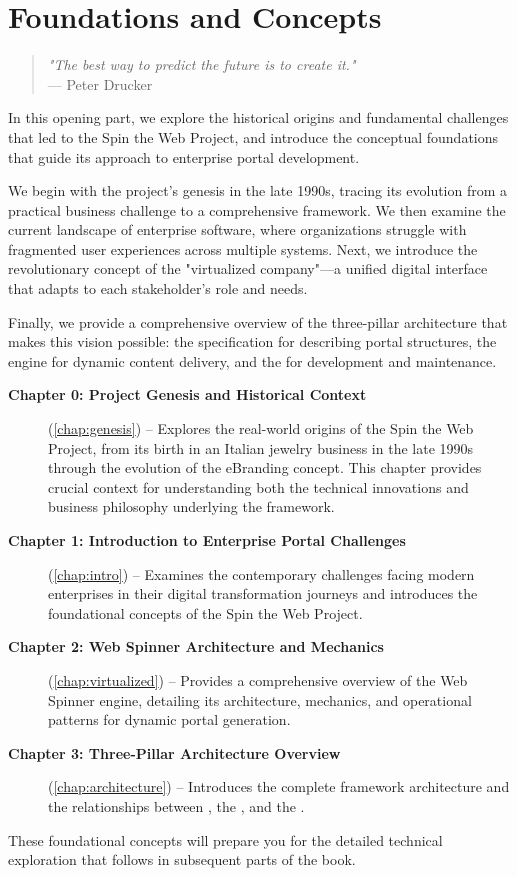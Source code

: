 
\part{Foundations and Concepts}
\label{part:foundations}

\begin{quote}
\textit{"The best way to predict the future is to create it."} \\
— Peter Drucker
\end{quote}

In this opening part, we explore the historical origins and fundamental challenges that led to the Spin the Web Project, and introduce the conceptual foundations that guide its approach to enterprise portal development.

We begin with the project's genesis in the late 1990s, tracing its evolution from a practical business challenge to a comprehensive framework. We then examine the current landscape of enterprise software, where organizations struggle with fragmented user experiences across multiple systems. Next, we introduce the revolutionary concept of the "virtualized company"—a unified digital interface that adapts to each stakeholder's role and needs.

Finally, we provide a comprehensive overview of the three-pillar architecture that makes this vision possible: the \wbdl{} specification for describing portal structures, the \webspinner{} engine for dynamic content delivery, and the \studio{} for development and maintenance.

\begin{description}
\item[\textbf{Chapter 0: Project Genesis and Historical Context}] (\cref{chap:genesis}) -- Explores the real-world origins of the Spin the Web Project, from its birth in an Italian jewelry business in the late 1990s through the evolution of the eBranding concept. This chapter provides crucial context for understanding both the technical innovations and business philosophy underlying the framework.

\item[\textbf{Chapter 1: Introduction to Enterprise Portal Challenges}] (\cref{chap:intro}) -- Examines the contemporary challenges facing modern enterprises in their digital transformation journeys and introduces the foundational concepts of the Spin the Web Project.

\item[\textbf{Chapter 2: Web Spinner Architecture and Mechanics}] (\cref{chap:virtualized}) -- Provides a comprehensive overview of the Web Spinner engine, detailing its architecture, mechanics, and operational patterns for dynamic portal generation.

\item[\textbf{Chapter 3: Three-Pillar Architecture Overview}] (\cref{chap:architecture}) -- Introduces the complete framework architecture and the relationships between \wbdl{}, the \webspinner{}, and the \studio{}.
\end{description}

These foundational concepts will prepare you for the detailed technical exploration that follows in subsequent parts of the book.
